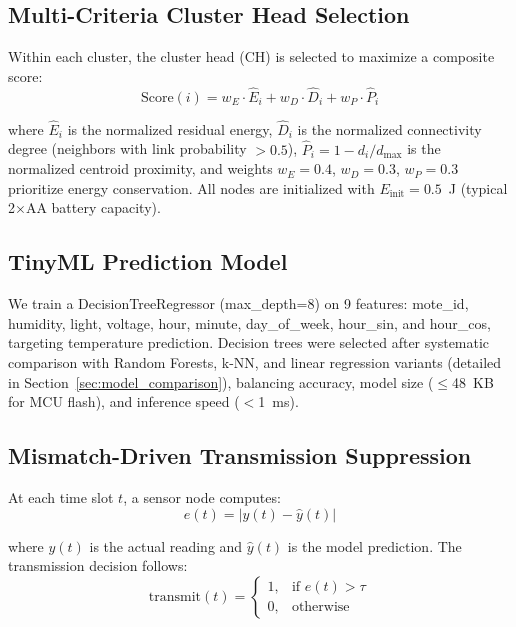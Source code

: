 \documentclass[conference]{IEEEtran}
\begin{document}
\subsection{Multi-Criteria Cluster Head Selection}

Within each cluster, the cluster head (CH) is selected to maximize a composite score:
\begin{equation}
\text{Score}(i) = w_E \cdot \hat{E}_i + w_D \cdot \hat{D}_i + w_P \cdot \hat{P}_i
\label{eq:ch_score}
\end{equation}

where $\hat{E}_i$ is the normalized residual energy, $\hat{D}_i$ is the normalized connectivity degree (neighbors with link probability $> 0.5$), $\hat{P}_i = 1 - d_i/d_{\max}$ is the normalized centroid proximity, and weights $w_E = 0.4$, $w_D = 0.3$, $w_P = 0.3$ prioritize energy conservation. All nodes are initialized with $E_{\text{init}} = 0.5$~J (typical 2$\times$AA battery capacity).

\subsection{TinyML Prediction Model}

We train a DecisionTreeRegressor (max\_depth=8) on 9 features: mote\_id, humidity, light, voltage, hour, minute, day\_of\_week, hour\_sin, and hour\_cos, targeting temperature prediction. Decision trees were selected after systematic comparison with Random Forests, k-NN, and linear regression variants (detailed in Section~\ref{sec:model_comparison}), balancing accuracy, model size ($\leq$48~KB for MCU flash), and inference speed ($<$1~ms).

\subsection{Mismatch-Driven Transmission Suppression}

At each time slot $t$, a sensor node computes:
\begin{equation}
e(t) = |y(t) - \hat{y}(t)|
\label{eq:error}
\end{equation}

where $y(t)$ is the actual reading and $\hat{y}(t)$ is the model prediction. The transmission decision follows:
\begin{equation}
\text{transmit}(t) = \begin{cases} 1, & \text{if } e(t) > \tau \\ 0, & \text{otherwise} \end{cases}
\label{eq:transmit}
\end{equation}
\end{document}
